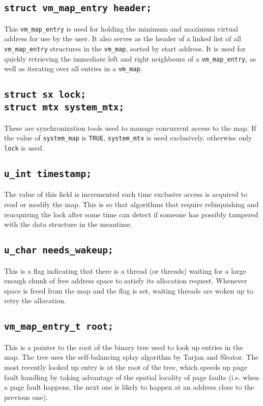 \documentclass[shortabstract, english]{iithesis}
\begin{document}
\subsection*{\texttt{struct vm_map_entry header;}}
This \texttt{vm_map_entry} is used for holding the minimum and maximum virtual
address for use by the user. It also serves as the header of a linked list of
all \texttt{vm_map_entry} structures in the \texttt{vm_map}, sorted by start
address. It is used for quickly retrieving the immediate left and right
neighbours of a \texttt{vm_map_entry}, as well as iterating over all entries
in a \texttt{vm_map}.

\subsection*{\texttt{struct sx lock;}\\
  \texttt{struct mtx system_mtx;}}
These are synchronization tools used to manage concurrent access to the map. If
the value of \texttt{system_map} is \texttt{TRUE}, \texttt{system_mtx} is used
exclusively, otherwise only \texttt{lock} is used.

\subsection*{\texttt{u_int timestamp;}}
The value of this field is incremented each time exclusive access is acquired to
read or modify the map. This is so that algorithms that require relinquishing
and reacquiring the lock after some time can detect if someone has possibly
tampered with the data structure in the meantime.

\subsection*{\texttt{u_char needs_wakeup;}}
This is a flag indicating that there is a thread (or threads) waiting for a
large enough chunk of free address space to satisfy its allocation request.
Whenever space is freed from the map and the flag is set, waiting threads are
woken up to retry the allocation.

\subsection*{\texttt{vm_map_entry_t root;}}
This is a pointer to the root of the binary tree used to look up entries in the
map. The tree uses the self-balancing splay algorithm by Tarjan and Sleator. The
most recently looked up entry is at the root of the tree, which speeds up page
fault handling by taking advantage of the spatial locality of page faults (i.e.
when a page fault happens, the next one is likely to happen at an address close
to the previous one).
\end{document}
